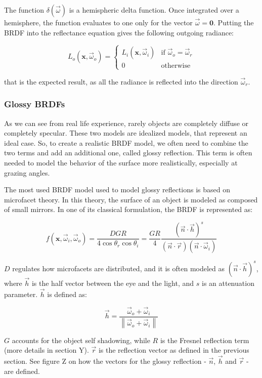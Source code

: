 The function $\delta(\vec{\omega})$ is a hemispheric delta function. Once integrated over a hemisphere, the function evaluates to one only for the vector $\vec{\omega} = \mathbf{0}$. Putting the BRDF into the reflectance equation gives the following outgoing radiance:

\begin{equation*}
L_o(\mathbf{x}, \vec{\omega}_o) = \begin{cases}
L_i(\mathbf{x}, \vec{\omega}_i)  &\text{if $\vec{\omega}_o = \vec{\omega}_r$}\\
0 &\text{otherwise}
\end{cases}
\end{equation*}

that is the expected result, as all the radiance is reflected into the direction $\vec{\omega}_r$.

\subsubsection{Glossy BRDFs}

As we can see from real life experience, rarely objects are completely diffuse or completely specular. These two models are idealized models, that represent an ideal case. So, to create a realistic BRDF model, we often need to combine the two terms and add an additional one, called glossy reflection. This term is often needed to model the behavior of the surface more realistically, especially at grazing angles.

The most used BRDF model used to model glossy reflections is based on microfacet theory. In this theory, the surface of an object is modeled as composed of small mirrors. In one of its classical formulation, the BRDF is represented as:

$$
f(\mathbf{x}, \vec{\omega}_i, \vec{\omega}_o) = \frac{D G R}{4 \cos\theta_r \cos\theta_i} = \frac{G R}{4} \frac{(\vec{n}\cdot\vec{h})^s}{(\vec{n}\cdot\vec{r})(\vec{n}\cdot\vec{\omega}_i)}
$$

$D$ regulates how microfacets are distributed, and it is often modeled as $(\vec{n}\cdot\vec{h})^s$, where $\vec{h}$ is the half vector between the eye and the light, and $s$ is an attenuation parameter. $\vec{h}$ is defined as:

$$
\vec{h} = \frac{\vec{\omega}_o + \vec{\omega}_i}{\left\| \vec{\omega}_o + \vec{\omega}_i \right\|}
$$

$G$ accounts for the object self shadowing, while $R$ is the Fresnel reflection term (more details in section Y).	$\vec{r}$ is the reflection vector as defined in the previous section. See figure Z on how the vectors for the glossy reflection - $\vec{n}$, $\vec{h}$ and $\vec{r}$ - are defined.

